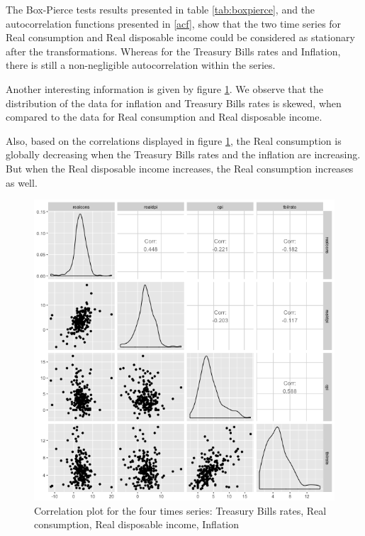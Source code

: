 The Box-Pierce tests results presented in table \ref{tab:boxpierce}, and the autocorrelation functions presented in \ref{acf}, show that the two time series for Real consumption and Real disposable income could be considered as stationary after the transformations. Whereas for the Treasury Bills rates and Inflation, there is still a non-negligible autocorrelation within the series. 

\medskip

Another interesting information is given by figure \ref{corrplot}. We observe that the distribution of the data for inflation and Treasury Bills rates is skewed, when compared to the data for Real consumption and Real disposable income. 

\medskip

Also, based on the correlations displayed in figure \ref{corrplot}, the Real consumption is globally  decreasing when the Treasury Bills rates and the inflation are increasing. But when the Real disposable income increases, the Real consumption increases as well. 

\begin{figure}[!htb]
\centering
\includegraphics[width=14cm]{gfx/chapter-rvfl-ensembles/scatterplot.png}
\caption{Correlation plot for the four times series: Treasury Bills rates, Real consumption, Real disposable income, Inflation}
\label{corrplot}
\end{figure}

